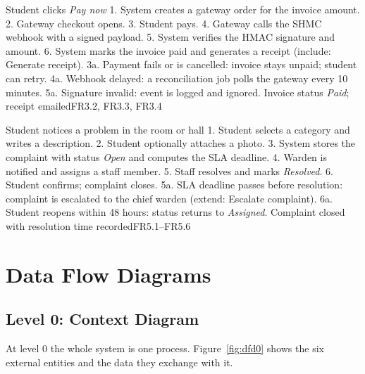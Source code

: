 \documentclass[11pt,a4paper]{report}
\begin{document}
{Student clicks \emph{Pay now}}
{1. System creates a gateway order for the invoice amount. 2. Gateway checkout opens. 3. Student pays. 4. Gateway calls the SHMC webhook with a signed payload. 5. System verifies the HMAC signature and amount. 6. System marks the invoice paid and generates a receipt (include: Generate receipt).}
{3a. Payment fails or is cancelled: invoice stays unpaid; student can retry. 4a. Webhook delayed: a reconciliation job polls the gateway every 10 minutes. 5a. Signature invalid: event is logged and ignored.}
{Invoice status \emph{Paid}; receipt emailed}{FR3.2, FR3.3, FR3.4}

{Student notices a problem in the room or hall}
{1. Student selects a category and writes a description. 2. Student optionally attaches a photo. 3. System stores the complaint with status \emph{Open} and computes the SLA deadline. 4. Warden is notified and assigns a staff member. 5. Staff resolves and marks \emph{Resolved}. 6. Student confirms; complaint closes.}
{5a. SLA deadline passes before resolution: complaint is escalated to the chief warden (extend: Escalate complaint). 6a. Student reopens within 48 hours: status returns to \emph{Assigned}.}
{Complaint closed with resolution time recorded}{FR5.1--FR5.6}

\section{Data Flow Diagrams}
\subsection{Level 0: Context Diagram}
At level 0 the whole system is one process. Figure~\ref{fig:dfd0} shows the six external entities and the data they exchange with it.
\end{document}
